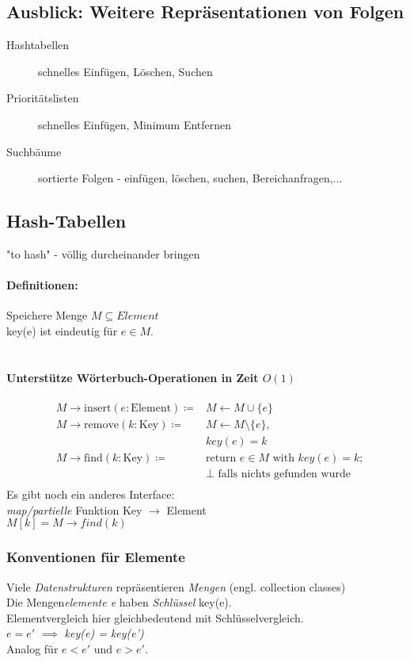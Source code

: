 \documentclass[a4paper]{scrartcl}
\begin{document}
\subsection{Ausblick: Weitere Repräsentationen von Folgen}
	\begin{description}
		\item[Hashtabellen] schnelles Einfügen, Löschen, Suchen 
		\item[Prioritätslisten] schnelles Einfügen, Minimum Entfernen
		\item[Suchbäume] sortierte Folgen - einfügen, löschen, suchen, Bereichanfragen,...
	\end{description}

	\subsection{Hash-Tabellen}
		"to hash" - völlig durcheinander bringen
		
		\paragraph{Definitionen:}
			Speichere Menge \( M \subseteq Element \)\\
			key(e) ist eindeutig für \( e \in M \).\\
			\\
		\paragraph{Unterstütze Wörterbuch-Operationen in Zeit \( O(1) \)}
			\begin{align*}
				&M \rightarrow \text{insert} (e : \text{Element}) \coloneqq & M \gets M \cup \{e\}\\
				&M \rightarrow \text{remove}  (k : \text{Key}) \coloneqq &M \gets M \setminus \{e\},\\
				&															& key(e)= k\\
				&M \rightarrow \text{find} (k : \text{Key}) \coloneqq &\text{return } e \in M \text{ with } key(e) = k;\\
				&																									&\perp \text{ falls nichts gefunden wurde }\\
			\end{align*}
			Es gibt noch ein anderes Interface:\\
			\emph{map/partielle} Funktion Key \( \rightarrow \) Element\\
			\(M[k] = M\rightarrow find(k)\)
			
		\subsubsection{Konventionen für Elemente}
			Viele \emph{Datenstrukturen} repräsentieren \emph{Mengen} (engl. collection classes)\\
			Die Mengen\emph{elemente e} haben \emph{Schlüssel} key(e).\\
			Elementvergleich hier gleichbedeutend mit Schlüsselvergleich.\\
			\emph{\( e = e' \)} \( \implies \) \emph{key(e) = key(e')}\\
			Analog für \( e< e' \text{ und } e > e' \).
		
\end{document}
